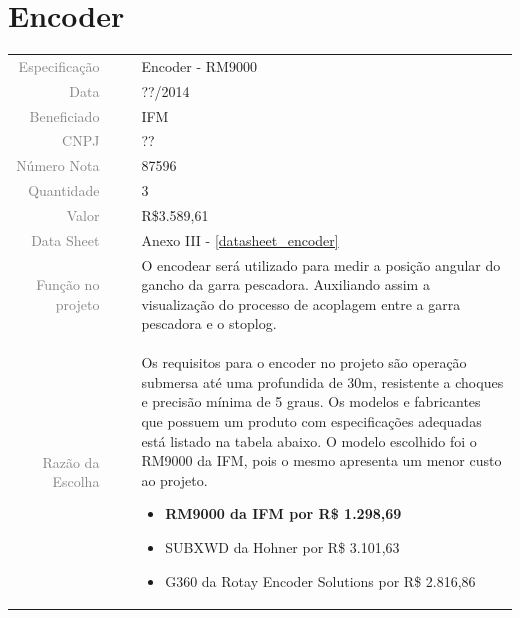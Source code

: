 

\section{Encoder}
\label{encoder}

 
\begin{table}[ht!]

	\begin{tabular}{r l|l p{12cm} }
		
		\textcolor{gray}{Especificação} &&& 	{Encoder - RM9000 }\\
		\textcolor{gray}{Data} &&& 				{??/2014}\\
        \textcolor{gray}{Beneficiado} &&&		{IFM} \\
        \textcolor{gray}{CNPJ} &&& 				{??} \\
        \textcolor{gray}{Número Nota} &&& 		{87596} \\
		\textcolor{gray}{Quantidade} &&& 		{3} \\
		\textcolor{gray}{Valor} &&& 			{R\$3.589,61} \\
		\textcolor{gray}{Data Sheet} &&& 		{Anexo III - \ref{datasheet_encoder} } \\

		\textcolor{gray}{Função no projeto} &&& {O encodear será utilizado para medir a posição angular do gancho da garra pescadora. Auxiliando assim a visualização do processo de acoplagem entre a garra pescadora e o stoplog.   } \\
		\textcolor{gray}{Razão da Escolha} &&& {Os requisitos para o encoder no projeto são operação submersa até uma profundida de 30m, resistente a choques e precisão mínima de 5 graus.  Os modelos e fabricantes que possuem um produto com especificações adequadas está listado na tabela abaixo. O modelo escolhido foi o RM9000 da IFM, pois o mesmo apresenta um menor custo ao projeto. 
		\begin{itemize}
		  \item \textbf{RM9000 da IFM por R\$ 1.298,69} 
		  \item SUBXWD da Hohner por R\$ 3.101,63
		  \item G360 da Rotay Encoder Solutions por R\$ 2.816,86
		\end{itemize}}
		

	\end{tabular}
\end{table}

\newpage


